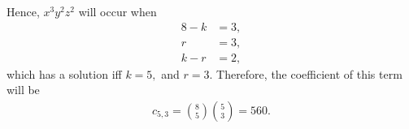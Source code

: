 \documentclass[12pt]{article}
\begin{document}
\begin{enumerate}
\begin{enumerate}
        Hence, $x^3y^2z^2$ will occur when
        \begin{align*}
          8 - k &= 3, \\
          r &= 3, \\
          k - r &= 2,
        \end{align*}
        which has a solution iff $k = 5,$ and $r = 3.$ Therefore, the
        coefficient of this term will be
        \begin{align*}
          c_{5, 3} = {8 \choose 5} {5 \choose 3} = 560.
        \end{align*}
    \end{enumerate}
\end{enumerate}
\end{document}
